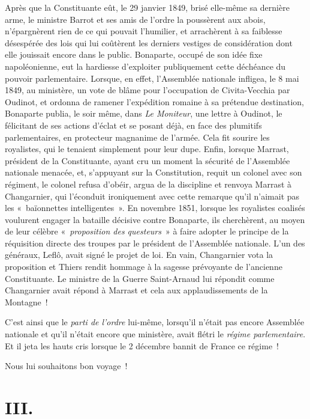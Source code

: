 \documentclass[french,twoside]{book} %
\newcommand\chapteropen{} %
\newcommand\chapterclose{} %
\begin{document}
Après que la Constituante eût, le 29 janvier 1849, brisé elle-même sa dernière arme, le ministre Barrot et ses amis de l’ordre la poussèrent aux abois, n’épargnèrent rien de ce qui pouvait l’humilier, et arrachèrent à sa faiblesse désespérée des lois qui lui coûtèrent les derniers vestiges de considération dont elle jouissait encore dans le public. Bonaparte, occupé de son idée fixe napoléonienne, eut la hardiesse d’exploiter publiquement cette déchéance du pouvoir parlementaire. Lorsque, en effet, l’Assemblée nationale infligea, le 8 mai 1849, au ministère, un vote de blâme pour l’occupation de Civita-Vecchia par Oudinot, et ordonna de ramener l’expédition romaine à sa prétendue destination, Bonaparte publia, le soir même, dans \emph{Le Moniteur}, une lettre à Oudinot, le félicitant de ses actions d’éclat et se posant déjà, en face des plumitifs parlementaires, en protecteur magnanime de l’armée. Cela fit sourire les royalistes, qui le tenaient simplement pour leur dupe. Enfin, lorsque Marrast, président de la Constituante, ayant cru un moment la sécurité de l’Assemblée nationale menacée, et, s’appuyant sur la Constitution, requit un colonel avec son régiment, le colonel refusa d’obéir, argua de la discipline et renvoya Marrast à Changarnier, qui l’éconduit ironiquement avec cette remarque qu’il n’aimait pas les « baïonnettes intelligentes ». En novembre 1851, lorsque les royalistes coalisés voulurent engager la bataille décisive contre Bonaparte, ils cherchèrent, au moyen de leur célèbre « \emph{proposition des questeurs} » à faire adopter le principe de la réquisition directe des troupes par le président de l’Assemblée nationale. L’un des généraux, Leflô, avait signé le projet de loi. En vain, Changarnier vota la proposition et Thiers rendit hommage à la sagesse prévoyante de l’ancienne Constituante. Le ministre de la Guerre Saint-Arnaud lui répondit comme Changarnier avait répond à Marrast et cela aux applaudissements de la Montagne !\par
C’est ainsi que le \emph{parti de l’ordre} lui-même, lorsqu’il n’était pas encore Assemblée nationale et qu’il n’était encore que ministère, avait flétri le \emph{régime parlementaire}. Et il jeta les hauts cris lorsque le 2 décembre bannit de France ce régime !\par
Nous lui souhaitons bon voyage !
\chapterclose


\chapteropen
\chapter[III.]{III.}\renewcommand{\leftmark}{III.}
\end{document}
